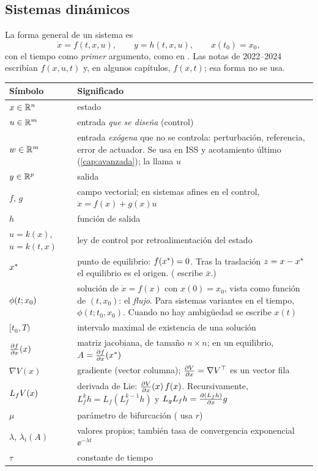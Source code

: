 \subsection*{Sistemas dinámicos}

La forma general de un sistema es
\[
\dot x=f(t,x,u),\qquad y=h(t,x,u),\qquad x(t_0)=x_0,
\]
con el tiempo como \emph{primer} argumento, como en \citet{Kha02}. Las notas de 2022--2024 escribían $f(x,u,t)$ y, en algunos capítulos, $f(x,t)$; esa forma no se usa.


\small
\begin{tabular}{@{}>{\raggedright\arraybackslash}p{3.0cm}>{\raggedright\arraybackslash}p{9.5cm}@{}}
\toprule
Símbolo & Significado \\
\midrule
$x\in\mathbb{R}^n$ & estado \\
$u\in\mathbb{R}^m$ & entrada \emph{que se diseña} (control) \\
$w\in\mathbb{R}^{m}$ & entrada \emph{exógena} que no se controla: perturbación, referencia, error de actuador. Se usa en ISS y acotamiento último (\cref{cap:avanzada}); \citet{Kha02} la llama $u$ \\
$y\in\mathbb{R}^p$ & salida \\
$f$, $g$ & campo vectorial; en sistemas afines en el control, $\dot x=f(x)+g(x)u$ \\
$h$ & función de salida \\
$u=k(x)$, $u=k(t,x)$ & ley de control por retroalimentación del estado \\
$x^{*}$ & punto de equilibrio: $f(x^{*})=0$. Tras la traslación $z=x-x^{*}$ el equilibrio es el origen. (\citet{Kha02} escribe $\bar x$.) \\
$\phi(t;x_0)$ & solución de $\dot x=f(x)$ con $x(0)=x_0$, vista como función de $(t,x_0)$: el \emph{flujo}. Para sistemas variantes en el tiempo, $\phi(t;t_0,x_0)$. Cuando no hay ambigüedad se escribe $x(t)$ \\
$[t_0,T)$ & intervalo maximal de existencia de una solución \\
$\frac{\partial f}{\partial x}(x)$ & matriz jacobiana, de tamaño $n\times n$; en un equilibrio, $A=\frac{\partial f}{\partial x}(x^{*})$ \\
$\nabla V(x)$ & gradiente (vector columna); $\frac{\partial V}{\partial x}=\nabla V^{\top}$ es un vector fila \\
$L_{f}V(x)$ & derivada de Lie: $\frac{\partial V}{\partial x}(x)\,f(x)$. Recursivamente, $L_f^kh=L_f(L_f^{k-1}h)$ y $L_gL_fh=\frac{\partial (L_fh)}{\partial x}g$ \\
$\mu$ & parámetro de bifurcación (\citet{Str15} usa $r$) \\
$\lambda$, $\lambda_i(A)$ & valores propios; también tasa de convergencia exponencial $\ee^{-\lambda t}$ \\
$\tau$ & constante de tiempo \\
\bottomrule
\end{tabular}


